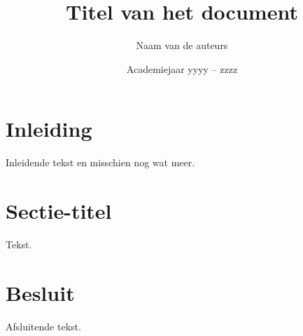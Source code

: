 \documentclass[a4paper,kulak]{kulakarticle} %
\date{Academiejaar yyyy -- zzzz}
\title{Titel van het document}
\author{Naam van de auteurs}
\begin{document}
\maketitle

\section*{Inleiding}

Inleidende tekst en misschien nog wat meer.

\section{Sectie-titel}

Tekst.

\section*{Besluit}

Afsluitende tekst.
\end{document}
